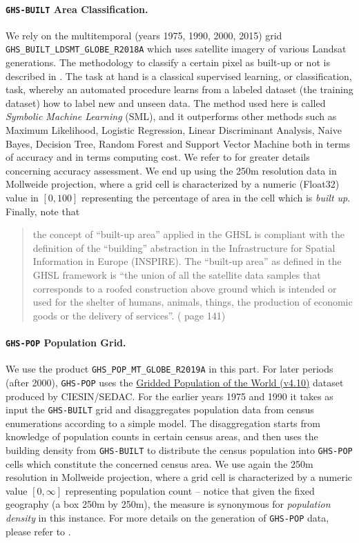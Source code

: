 \documentclass[11pt]{report}
\begin{document}
\paragraph{\texttt{GHS-BUILT} Area Classification.} We rely on the multitemporal (years 1975, 1990, 2000, 2015) grid \texttt{GHS\_BUILT\_LDSMT\_GLOBE\_R2018A} which uses satellite imagery of various Landsat generations. The methodology to classify a certain pixel as built-up or not is described in \cite{GHSL-method}. The task at hand is a classical supervised learning, or classification, task, whereby an automated procedure learns from a labeled dataset (the training dataset) how to label new and unseen data. The method used here is called \emph{Symbolic Machine Learning} (SML), and it outperforms other methods such as Maximum Likelihood, Logistic Regression, Linear Discriminant Analysis, Naive Bayes, Decision Tree, Random Forest and Support Vector Machine both in terms of accuracy and in terms computing cost. We refer to \cite{GHSL-method} for greater details concerning accuracy assessment. We end up using the 250m resolution data in Mollweide projection, where a grid cell is characterized by a numeric (Float32) value in $[0,100]$ representing the percentage of area in the cell which is \emph{built up}. Finally, note that 
\begin{quotation}
\noindent the concept of “built-up area” applied in the GHSL is compliant with the definition of the “building” abstraction in the Infrastructure for Spatial Information in Europe (INSPIRE). The “built-up area” as defined in the GHSL framework is “the union of all the satellite data samples that corresponds to a roofed construction above ground which is intended or used for the shelter of humans, animals, things, the production of economic goods or the delivery of services”. (\cite{GHSL-method} page 141)
\end{quotation}


\paragraph{\texttt{GHS-POP} Population Grid.} We use the product \texttt{GHS\_POP\_MT\_GLOBE\_R2019A} in this part. For later periods (after 2000), \texttt{GHS-POP} uses the \href{https://sedac.ciesin.columbia.edu/data/collection/gpw-v4}{Gridded Population of the World (v4.10)} dataset produced by CIESIN/SEDAC. For the earlier years 1975 and 1990 it takes as input the \texttt{GHS-BUILT} grid and disaggregates population data from census enumerations according to a simple model. The disaggregation starts from knowledge of population counts in certain census areas, and then uses the building density from \texttt{GHS-BUILT} to distribute the census population into \texttt{GHS-POP} cells which constitute the concerned census area. We use again the 250m resolution in Mollweide projection, where a grid cell is characterized by a numeric value $[0,\infty]$ representing population count -- notice that given the fixed geography (a box 250m by 250m), the measure is synonymous for \emph{population density} in this instance. For more details on the generation of \texttt{GHS-POP} data, please refer to \cite{GHSL-popgrid}.
\end{document}
